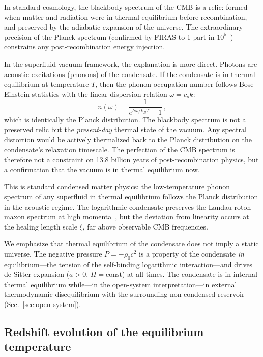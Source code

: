 \documentclass[12pt, a4paper]{article}
\begin{document}
In standard cosmology, the blackbody spectrum of the CMB is a relic: formed when matter and radiation were in thermal equilibrium before recombination, and preserved by the adiabatic expansion of the universe. The extraordinary precision of the Planck spectrum (confirmed by FIRAS to 1 part in $10^5$~\cite{fixsen_2009}) constrains any post-recombination energy injection.

In the superfluid vacuum framework, the explanation is more direct. Photons are acoustic excitations (phonons) of the condensate. If the condensate is in thermal equilibrium at temperature $T$, then the phonon occupation number follows Bose-Einstein statistics with the linear dispersion relation $\omega = c_s k$:
\begin{equation}
    n(\omega) = \frac{1}{e^{\hbar\omega/k_B T} - 1}\,,
\end{equation}
which is identically the Planck distribution. The blackbody spectrum is not a preserved relic but the \emph{present-day} thermal state of the vacuum. Any spectral distortion would be actively thermalized back to the Planck distribution on the condensate's relaxation timescale. The perfection of the CMB spectrum is therefore not a constraint on 13.8 billion years of post-recombination physics, but a confirmation that the vacuum is in thermal equilibrium now.

This is standard condensed matter physics: the low-temperature phonon spectrum of any superfluid in thermal equilibrium follows the Planck distribution in the acoustic regime. The logarithmic condensate preserves the Landau roton-maxon spectrum at high momenta~\cite{landau_1947}, but the deviation from linearity occurs at the healing length scale $\xi$, far above observable CMB frequencies.

We emphasize that thermal equilibrium of the condensate does not imply a static universe. The negative pressure $P = -\rho_0 c^2$ is a property of the condensate \emph{in} equilibrium---the tension of the self-binding logarithmic interaction---and drives de Sitter expansion ($\ddot{a} > 0$, $H = \mathrm{const}$) at all times. The condensate is in internal thermal equilibrium while---in the open-system interpretation---in external thermodynamic disequilibrium with the surrounding non-condensed reservoir (Sec.~\ref{sec:open-system}).

\subsection{Redshift evolution of the equilibrium temperature}
\label{sec:tcmb_evolution}
\end{document}
